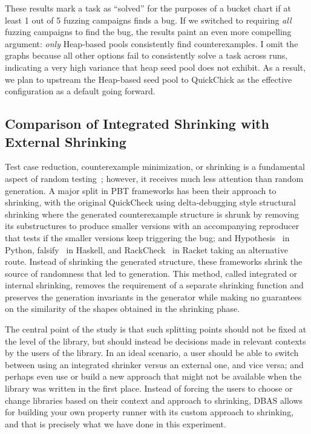 These results mark a task as ``solved'' for the purposes of a bucket chart if at least
1 out of 5 fuzzing campaigns finds a bug. If we switched to requiring {\em all} fuzzing
campaigns to find the bug, the results paint an even more compelling argument: {\em
only} Heap-based pools consistently find counterexamples. I omit the graphs because all
other options fail to consistently solve a task across runs, indicating a very high
variance that heap seed pool does not exhibit. As a result, we plan to upstream the
Heap-based seed pool to QuickChick as the effective configuration as a default going
forward.

\subsection{Comparison of Integrated Shrinking with External Shrinking}\label{sec:shrink-comp}

Test case reduction, counterexample minimization, or shrinking is a fundamental aspect
of random testing~\cite{zeller2002simplifying}; however, it receives much less
attention than random generation. A major split in PBT frameworks has been their
approach to shrinking, with the original QuickCheck using delta-debugging style
structural shrinking where the generated counterexample structure is shrunk by removing
its substructures to produce smaller versions with an accompanying reproducer that
tests if the smaller versions keep triggering the bug; and
Hypothesis~\cite{HypothesisShrinking} in Python, falsify~\cite{falsifyLeo2023} in
Haskell, and RackCheck~\cite{rackcheck} in Racket taking an alternative route. Instead
of shrinking the generated structure, these frameworks shrink the source of randomness
that led to generation. This method, called integrated or internal shrinking, removes
the requirement of a separate shrinking function and preserves the generation
invariants in the generator while making no guarantees on the similarity of the shapes
obtained in the shrinking phase.

The central point of the study is that such splitting points should not be fixed at the
level of the library, but should instead be decisions made in relevant contexts by the
users of the library. In an ideal scenario, a user should be able to switch between
using an integrated shrinker versus an external one, and vice versa; and perhaps even
use or build a new approach that might not be available when the library was written in
the first place. Instead of forcing the users to choose or change libraries based on
their context and approach to shrinking, DBAS allows for building your own property
runner with its custom approach to shrinking, and that is precisely what we have done
in this experiment.

